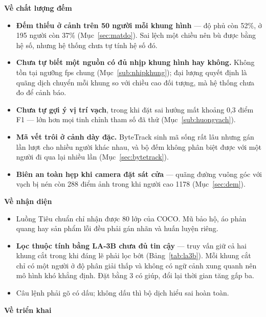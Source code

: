 \textbf{Về chất lượng đếm}

\begin{itemize}[leftmargin=*, itemsep=2pt]
  \item \textbf{Đếm thiếu ở cảnh trên 50 người mỗi khung hình} --- độ phủ còn 52\%, ở
        195 người còn 37\% (Mục~\ref{sec:matdo}). Sai lệch một chiều nên bù được bằng
        hệ số, nhưng hệ thống chưa tự tính hệ số đó.
  \item \textbf{Chưa tự biết một nguồn có đủ nhịp khung hình hay không.} Không tồn tại
        ngưỡng fps chung (Mục~\ref{sub:nhipkhung}); đại lượng quyết định là quãng dịch
        chuyển mỗi khung so với chiều cao đối tượng, mà hệ thống chưa đo để cảnh báo.
  \item \textbf{Chưa tự gợi ý vị trí vạch}, trong khi đặt sai hướng mất khoảng 0{,}3
        điểm F1 --- lớn hơn mọi tinh chỉnh tham số đã thử
        (Mục~\ref{sub:huongvach}).
  \item \textbf{Mã vết trôi ở cảnh dày đặc.} ByteTrack sinh mã sống rất lâu nhưng gán
        lần lượt cho nhiều người khác nhau, và bộ đếm không phân biệt được với một
        người đi qua lại nhiều lần (Mục~\ref{sec:bytetrack}).
  \item \textbf{Biên an toàn hẹp khi camera đặt sát cửa} --- quãng đường vuông góc với
        vạch bị nén còn 288 điểm ảnh trong khi người cao 1178 (Mục~\ref{sec:dem}).
\end{itemize}

\textbf{Về nhận diện}

\begin{itemize}[leftmargin=*, itemsep=2pt]
  \item Luồng Tiêu chuẩn chỉ nhận được 80 lớp của COCO. Mũ bảo hộ, áo phản quang hay
        sản phẩm lỗi đều phải gán nhãn và huấn luyện riêng.
  \item \textbf{Lọc thuộc tính bằng LA-3B chưa đủ tin cậy} --- truy vấn
         giữ cả hai khung cắt trong khi đáng lẽ phải lọc bớt
        (Bảng~\ref{tab:la3b}). Mỗi khung cắt chỉ có một người ở độ phân giải thấp và
        không có ngữ cảnh xung quanh nên mô hình khó khẳng định. Đặt 
        bằng 3 có giúp, đổi lại thời gian tăng gấp ba.
  \item Câu lệnh phải gõ có dấu; không dấu thì bộ dịch hiểu sai hoàn toàn.
\end{itemize}

\textbf{Về triển khai}

